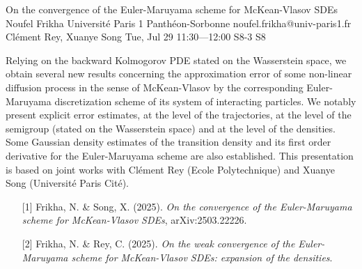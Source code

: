 \begin{talk}
  {On the convergence of the Euler-Maruyama scheme for McKean-Vlasov SDEs}%
  {Noufel Frikha}%
  {Universit\'e Paris 1 Panth\'eon-Sorbonne}%
  {noufel.frikha@univ-paris1.fr}%
  {Cl\'ement Rey, Xuanye Song}%
  {}%
  {Tue, Jul 29 11:30---12:00}%
  {S8-3}%
  {S8}%
  
    
   
Relying on the backward Kolmogorov PDE stated on the Wasserstein space, we obtain several new results concerning the approximation error of some non-linear diffusion process in the sense of McKean-Vlasov by the corresponding Euler-Maruyama discretization scheme of its system of interacting particles. We notably present explicit error estimates, at the level of the trajectories, at the level of the semigroup (stated on the Wasserstein space) and at the level of the densities. Some Gaussian density estimates of the transition density and its first order derivative for the Euler-Maruyama scheme are also established. This presentation is based on joint works with Cl\'ement Rey (Ecole Polytechnique) and Xuanye Song (Universit\'e Paris Cit\'e).

\medskip


\begin{enumerate}
 \item[{[1]}] Frikha, N.  \& Song, X. (2025). {\it On the convergence of the Euler-Maruyama scheme for McKean-Vlasov SDEs}, arXiv:2503.22226.
 \item[{[2]}] Frikha, N. \& Rey, C. (2025).  {\it On the weak convergence of the Euler-Maruyama scheme for McKean-Vlasov SDEs: expansion of the densities}.
\end{enumerate}


\end{talk}


